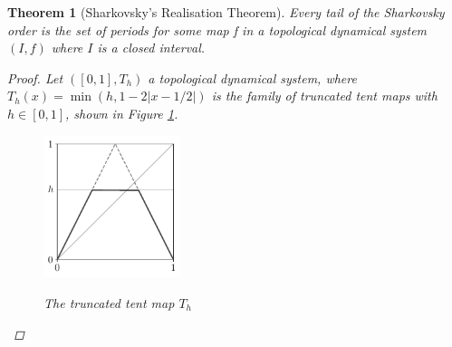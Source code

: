 \documentclass[11pt,a4paper,oneside]{memoir}
\theoremstyle{plain}
\newtheorem{thm}{Theorem}[chapter]
\theoremstyle{definition}
\begin{document}
\begin{thm}[Sharkovsky's Realisation Theorem] \label{thm:sharkovsky-realisation-theorem}
    Every tail of the Sharkovsky order is the set of periods for some map f in a topological dynamical system $(I, f)$ where $I$ is a closed interval.
    \begin{proof}
        Let $([0, 1], T_h)$ a topological dynamical system, where $T_h(x) = \min(h, 1-2|x-1/2|)$ is the family of truncated tent maps with $h \in [0, 1]$, shown in Figure \ref{fig:truncated_tent}.
        
        \begin{figure}[h]
            \centering
            \includegraphics[width=4cm]{truncated_tent_2}
            \label{fig:truncated_tent}
            \caption{The truncated tent map $T_h$}
        \end{figure}


\end{proof}
\end{thm}
\end{document}
